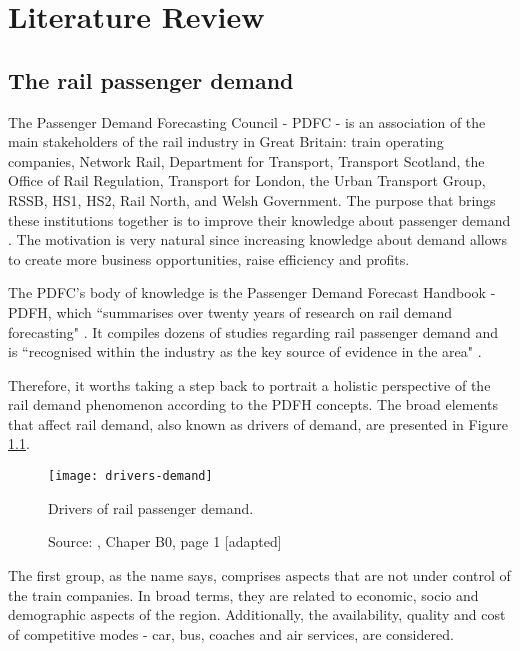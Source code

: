 \vspace{-2em}
\chapter{Literature Review}
\label{chp:lit-rev}

\section{The rail passenger demand}

The Passenger Demand Forecasting Council - PDFC - is an association of the main stakeholders of the rail industry in Great Britain: train operating companies, Network Rail, Department for Transport, Transport Scotland, the Office of Rail Regulation, Transport for London, the Urban Transport Group, RSSB, HS1, HS2, Rail North, and Welsh Government. The purpose that brings these institutions together is to improve their knowledge about passenger demand \citep{raildeliverygroup}. The motivation is very natural since increasing knowledge about demand allows to create more business opportunities, raise efficiency and profits.

The PDFC's body of knowledge is the Passenger Demand Forecast Handbook - PDFH, which ``summarises over twenty years of research on rail demand forecasting" \citep{raildeliverygroup}. It compiles dozens of studies regarding rail passenger demand and is ``recognised within the industry as the key source of evidence in the area" \citep{raildeliverygroup}.

Therefore, it worths taking a step back to portrait a holistic perspective of the rail demand phenomenon according to the PDFH concepts. The broad elements that affect rail demand, also known as drivers of demand, are presented in Figure \ref{fig:drivers_demand}.

\begin{figure} [H]
\centering
\texttt{[image: drivers-demand]}
\caption{Drivers of rail passenger demand.}
\label{fig:drivers_demand}
\caption*{Source: \cite{pdfh}, Chaper B0, page 1 [adapted]}
\end{figure} 

The first group, as the name says, comprises aspects that are not under control of the train companies. In broad terms, they are related to economic, socio and demographic aspects of the region. Additionally, the availability, quality and cost of competitive modes - car, bus, coaches and air services, are considered.

